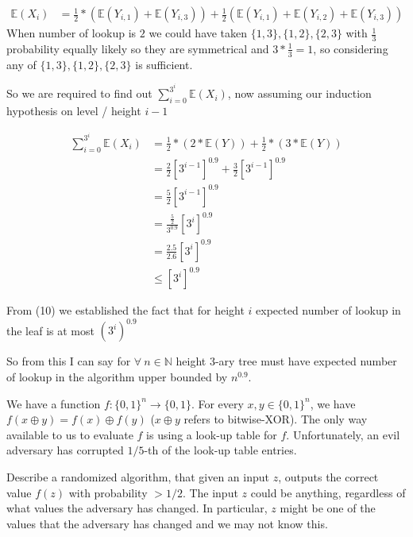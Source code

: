 \documentclass[addpoints,12pt]{exam}
\begin{document}
\begin{questions}
\begin{solution}
            \begin{align}
                \mathbb{E}(X_i) &= \frac{1}{2} * \left(\mathbb{E}(Y_{i, 1}) + \mathbb{E}(Y_{i, 3}) \right)+ \frac{1}{2} \left(\mathbb{E}(Y_{i, 1}) + \mathbb{E}(Y_{i, 2}) + \mathbb{E}(Y_{i, 3})\right)
            \end{align}
            When number of lookup is $2$ we could have taken $\{1, 3\}, \{1, 2\}, \{2, 3\}$ with $\frac{1}{3}$ probability equally likely so they are symmetrical and $3 * \frac{1}{3} = 1$, so considering any of $\{1, 3\}, \{1, 2\}, \{2, 3\}$ is sufficient.

            So we are required to find out $\displaystyle\sum_{i=0}^{3^{i}} \mathbb{E}(X_i)$, now assuming our induction hypothesis on level / height $i-1$

            \begin{align}
                \displaystyle\sum_{i=0}^{3^{i}} \mathbb{E}(X_i) &= \frac{1}{2} * (2 * \mathbb{E}(Y)) + \frac{1}{2} * (3 * \mathbb{E}(Y))\\
                &= \frac{2}{2} \left[3^{i-1}\right]^{0.9} + \frac{3}{2} \left[3^{i-1}\right]^{0.9}\\
                &= \frac{5}{2} \left[3^{i-1}\right]^{0.9}\\
                &= \frac{\frac{5}{2}}{3^{0.9}} \left[3^{i}\right]^{0.9}\\
                &= \frac{2.5}{2.6}\left[3^{i}\right]^{0.9}\\
                &\leq \left[3^{i}\right]^{0.9}
            \end{align}

        From (10) we established the fact that for height $i$ expected number of lookup in the leaf is at most $\left(3^{i}\right)^{0.9}$

        So from this I can say for $\forall \:n \in \mathbb{N}$ height 3-ary tree must have expected number of lookup in the algorithm upper bounded by $n^{0.9}$.
            
		\end{solution}
	
		\question[5] We have a function $f:\{0,1\}^n \to \{0,1\}$. For every $x,y \in \{0,1\}^n$, we have $f(x \oplus y) = f(x) \oplus f(y)$ ($x\oplus y$ refers to bitwise-XOR). The only way available to us to evaluate $f$ is using a look-up table for $f$. Unfortunately, an evil adversary has corrupted $1/5$-th of the look-up table entries.
		
		Describe a randomized algorithm, that given an input $z$, outputs the correct value $f(z)$ with probability $>1/2$. The input $z$ could be anything, regardless of what values the adversary has changed. In particular, $z$ might be one of the values that the adversary has changed and we may not know this.
		

\end{questions}
\end{document}
